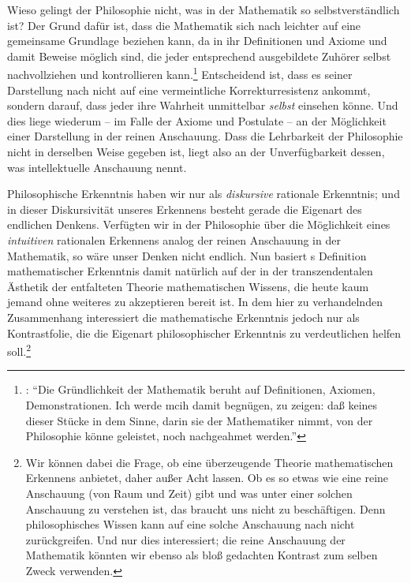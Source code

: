 Wieso gelingt der Philosophie nicht, was in der Mathematik so
selbstverständlich ist? Der Grund dafür ist, dass
die Mathematik sich nach  leichter auf eine gemeinsame
Grundlage beziehen kann, da in ihr Definitionen und Axiome und damit Beweise
möglich sind, die jeder entsprechend ausgebildete Zuhörer selbst nachvollziehen und kontrollieren
kann.\footnote{\cite[][B 754--766, insb. B
754\,f.,]{Kant:KritikderreinenVernunft2003} \cite[][III: 477.5--483.32, insb.\
477.5--8]{Kant:GesammelteWerke1900ff.}: \enquote{Die Gründlichkeit der Mathematik beruht auf Definitionen, Axiomen, Demonstrationen. Ich werde mcih
damit begnügen, zu zeigen: daß keines dieser Stücke in dem Sinne, darin sie der
Mathematiker nimmt, von der Philosophie könne geleistet, noch nachgeahmet
werden.}} Entscheidend ist, dass es seiner Darstellung nach nicht auf eine
vermeintliche Korrekturresistenz ankommt, sondern darauf, dass jeder ihre
Wahrheit unmittelbar \emph{selbst} einsehen könne. Und dies liege wiederum -- im
Falle der Axiome und Postulate -- an der Möglichkeit einer Darstellung in der
reinen Anschauung. Dass die Lehrbarkeit der Philosophie nicht in derselben Weise
gegeben ist, liegt also an der Unverfügbarkeit dessen, was \name[Immanuel]{Kant}
intellektuelle Anschauung nennt.

Philosophische Erkenntnis haben wir nur als \emph{diskursive} rationale
Erkenntnis; und in dieser Diskursivität unseres Erkennens besteht gerade die
Eigenart des endlichen Denkens.
Verfügten wir in der Philosophie über die Möglichkeit eines
\emph{intuitiven} rationalen Erkennens analog der reinen Anschauung in der
Mathematik, so wäre unser Denken
nicht endlich. Nun basiert s Definition mathematischer
Erkenntnis damit natürlich auf der in der transzendentalen Ästhetik der 
entfalteten Theorie mathematischen Wissens, die heute kaum jemand ohne weiteres
zu akzeptieren bereit ist. In dem hier zu verhandelnden Zusammenhang
interessiert die mathematische Erkenntnis jedoch nur als Kontrastfolie, die die
Eigenart philosophischer Erkenntnis zu verdeutlichen helfen soll.\footnote{Wir
können dabei die Frage, ob \name[Immanuel]{Kant} eine überzeugende Theorie
mathematischen Erkennens anbietet, daher außer Acht lassen. Ob es so etwas wie
eine reine Anschauung (von Raum und Zeit) gibt und was unter einer solchen
Anschauung zu verstehen ist, das braucht uns nicht zu beschäftigen. Denn
philosophisches Wissen kann auf eine solche Anschauung nach
 nicht zurückgreifen. Und nur dies interessiert; die reine
Anschauung der Mathematik könnten wir ebenso als bloß gedachten Kontrast zum
selben Zweck verwenden.}


